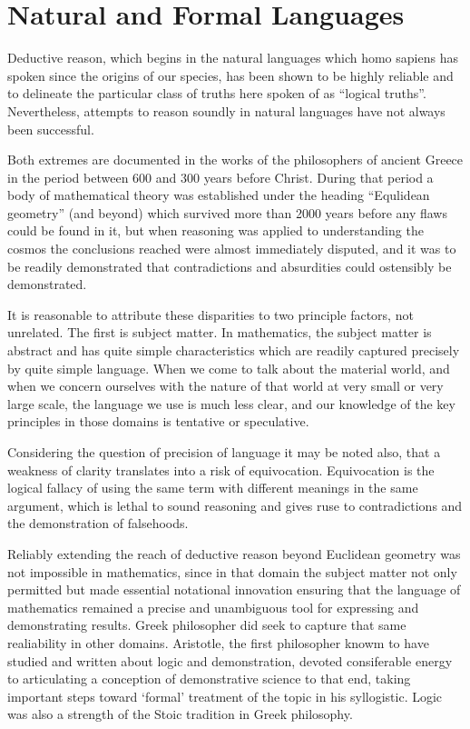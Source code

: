 \documentclass[10pt,titlepage]{article}
\begin{document}
\cite{heijenoort67,post21,godel30a,tarski31,tarski56,carnap47}

\section{Natural and Formal Languages}

Deductive reason, which begins in the natural languages which homo sapiens has spoken since the origins of our species, has been shown to be highly reliable and to delineate the particular class of truths here spoken of as ``logical truths''.
Nevertheless, attempts to reason soundly in natural languages have not always been successful.

Both extremes are documented in the works of the philosophers of ancient Greece in the period between 600 and 300 years before Christ.
During that period a body of mathematical theory was established under the heading ``Equlidean geometry'' (and beyond) which survived more than 2000 years before any flaws could be found in it, but when reasoning was applied to understanding the cosmos the conclusions reached were almost immediately disputed, and it was to be readily demonstrated that contradictions and absurdities could ostensibly be demonstrated.

It is reasonable to attribute these disparities to two principle factors, not unrelated.
The first is subject matter.
In mathematics, the subject matter is abstract and has quite simple characteristics which are readily captured precisely by quite simple language.
When we come to talk about the material world, and when we concern ourselves with the nature of that world at very small or very large scale, the language we use is much less clear, and our knowledge of the key principles in those domains is tentative or speculative.

Considering the question of precision of language it may be noted also, that a weakness of clarity translates into a risk of equivocation.
Equivocation is the logical fallacy of using the same term with different meanings in the same argument, which is lethal to sound reasoning and gives ruse to contradictions and the demonstration of falsehoods.

Reliably extending the reach of deductive reason beyond Euclidean geometry was not impossible in mathematics, since in that domain the subject matter not only permitted but made essential notational innovation ensuring that the language of mathematics remained a precise and unambiguous tool for expressing and demonstrating results.
Greek philosopher did seek to capture that same realiability in other domains.
Aristotle, the first philosopher knowm to have studied and written about logic and demonstration, devoted consiferable energy to articulating a conception of demonstrative science to that end, taking important steps toward `formal' treatment of the topic in his syllogistic.
Logic was also a strength of the Stoic tradition in Greek philosophy.
\end{document}
